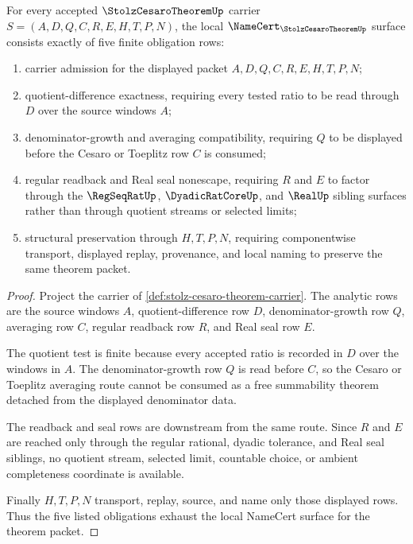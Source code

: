 \begin{theorem}
\label{thm:stolz-cesaro-theorem-namecert-obligations}
For every accepted $\StolzCesaroTheoremUp$ carrier $S=(A,D,Q,C,R,E,H,T,P,N)$, the local $\NameCert_{\StolzCesaroTheoremUp}$ surface consists exactly of five finite obligation rows:
\begin{enumerate}
\item carrier admission for the displayed packet $A,D,Q,C,R,E,H,T,P,N$;
\item quotient-difference exactness, requiring every tested ratio to be read through $D$ over the source windows $A$;
\item denominator-growth and averaging compatibility, requiring $Q$ to be displayed before the Cesaro or Toeplitz row $C$ is consumed;
\item regular readback and Real seal nonescape, requiring $R$ and $E$ to factor through the $\RegSeqRatUp$, $\DyadicRatCoreUp$, and $\RealUp$ sibling surfaces rather than through quotient streams or selected limits;
\item structural preservation through $H,T,P,N$, requiring componentwise transport, displayed replay, provenance, and local naming to preserve the same theorem packet.
\end{enumerate}
\end{theorem}
\begin{proof}
Project the carrier of \autoref{def:stolz-cesaro-theorem-carrier}. The analytic rows are the source windows $A$, quotient-difference row $D$, denominator-growth row $Q$, averaging row $C$, regular readback row $R$, and Real seal row $E$.

The quotient test is finite because every accepted ratio is recorded in $D$ over the windows in $A$. The denominator-growth row $Q$ is read before $C$, so the Cesaro or Toeplitz averaging route cannot be consumed as a free summability theorem detached from the displayed denominator data.

The readback and seal rows are downstream from the same route. Since $R$ and $E$ are reached only through the regular rational, dyadic tolerance, and Real seal siblings, no quotient stream, selected limit, countable choice, or ambient completeness coordinate is available.

Finally $H,T,P,N$ transport, replay, source, and name only those displayed rows. Thus the five listed obligations exhaust the local NameCert surface for the theorem packet.
\end{proof}

